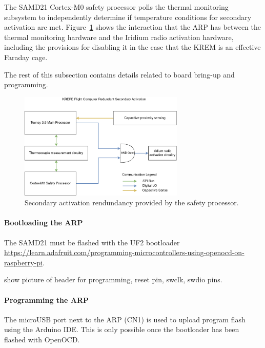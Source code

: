 \documentclass{article}
\begin{document}
The SAMD21 Cortex-M0 safety processor polls the thermal monitoring subsystem to independently determine if temperature conditions for secondary activation are met. Figure~\ref{fig:actred} shows the interaction that the ARP has between the thermal monitoring hardware and the Iridium radio activation hardware, including the provisions for disabling it in the case that the KREM is an effective Faraday cage.

The rest of this subsection contains details related to board bring-up and programming.


\begin{figure}[H]
  \centering
  \includegraphics[width=0.7\textwidth]{images/redundant-activation.png}
  \caption{Secondary activation rendundancy provided by the safety processor.}
  \label{fig:actred}
\end{figure}

\paragraph{Bootloading the ARP}
The SAMD21 must be flashed with the UF2 bootloader \url{https://learn.adafruit.com/programming-microcontrollers-using-openocd-on-raspberry-pi}.

show picture of header for programming, reset pin, swclk, swdio pins. 
\paragraph{Programming the ARP}
The microUSB port next to the ARP (CN1) is used to upload program flash using the Arduino IDE. This is only possible once the bootloader has been flashed with OpenOCD.
\end{document}
